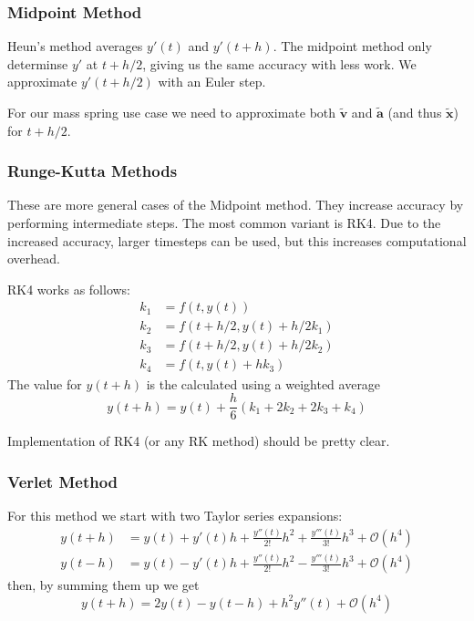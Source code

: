 \documentclass{article}
\begin{document}
\subsubsection{Midpoint Method}
Heun's method averages $y'(t)$ and $y'(t+h)$.
The midpoint method only determinse $y'$ at $t+h/2$, giving us the same accuracy with less work.
We approximate $y'(t+h/2)$ with an Euler step.

For our mass spring use case we need to approximate both $\bm{\tilde{v}}$ and $\bm{\tilde{a}}$ (and thus $\bm{\tilde{x}}$) for $t+h/2$.

\subsubsection{Runge-Kutta Methods}
These are more general cases of the Midpoint method.
They increase accuracy by performing intermediate steps.
The most common variant is RK4.
Due to the increased accuracy, larger timesteps can be used, but this increases computational overhead.

RK4 works as follows:
\begin{align}
    k_1 &= f(t, y(t))\\
    k_2 &= f(t+h/2, y(t)+h/2k_1)\\
    k_3 &= f(t+h/2, y(t)+h/2k_2)\\
    k_4 &= f(t, y(t)+hk_3)
\end{align}
The value for $y(t+h)$ is the calculated using a weighted average
\begin{equation}
    y(t+h) = y(t) + \frac{h}{6} (k_1 + 2k_2 + 2k_3 + k_4)
\end{equation}

Implementation of RK4 (or any RK method) should be pretty clear.

\subsubsection{Verlet Method}
For this method we start with two Taylor series expansions:
\begin{align}
    y(t+h) &= y(t) + y'(t)h + \frac{y''(t)}{2!}h^2 + \frac{y'''(t)}{3!}h^3 + \mathcal{O}(h^4)\\
    y(t-h) &= y(t) - y'(t)h + \frac{y''(t)}{2!}h^2 - \frac{y'''(t)}{3!}h^3 + \mathcal{O}(h^4)
\end{align}
then, by summing them up we get
\begin{equation}
    y(t+h) = 2y(t) - y(t-h) + h^2y''(t) + \mathcal{O}(h^4)
\end{equation}
\end{document}
